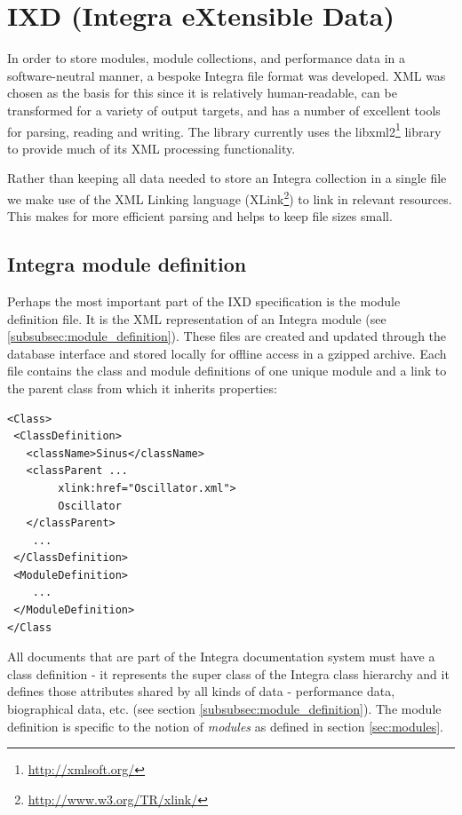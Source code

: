 \section{IXD (Integra eXtensible Data)}\label{sec:ixd}

In order to store modules, module collections, and performance data in
a software-neutral manner, a bespoke Integra file format was
developed. XML was chosen as the basis for this since it is relatively
human-readable, can be transformed for a variety of output targets,
and has a number of excellent tools for parsing, reading and writing.
The library currently uses the
libxml2\footnote{\url{http://xmlsoft.org/}} library to provide much of
its XML processing functionality.

Rather than keeping all data needed to store an Integra collection in
a single file we make use of the XML Linking language
(XLink\footnote{\url{http://www.w3.org/TR/xlink/}}) to link in
relevant resources. This makes for more efficient parsing and helps to
keep file sizes small.

\subsection{Integra module definition}\label{subsect:integra_class_definition}

Perhaps the most important part of the IXD specification is the module
definition file. It is the XML representation of an Integra module
(see \ref{subsubsec:module_definition}). These files are created and
updated through the database interface and stored locally for offline
access in a gzipped archive. Each file contains the class and module
definitions of one unique module and a link to the parent class from
which it inherits properties:

{\small
\begin{verbatim}
<Class>
 <ClassDefinition>
   <className>Sinus</className>
   <classParent ...
        xlink:href="Oscillator.xml">
        Oscillator
   </classParent>
    ...
 </ClassDefinition>
 <ModuleDefinition>
    ...
 </ModuleDefinition>
</Class
\end{verbatim}
} All documents that are part of the Integra documentation system must
have a class definition - it represents the super class of the Integra
class hierarchy and it defines those attributes shared by all kinds of
data - performance data, biographical data, etc. (see section
\ref{subsubsec:module_definition}). The module definition is specific
to the notion of \emph{modules} as defined in section
\ref{sec:modules}.

